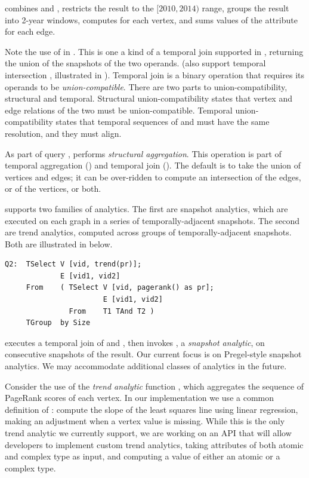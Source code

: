  combines \tgs {} and , restricts the
result to the $[2010, 2014)$ range, groups the result into 2-year
  windows, computes  for each vertex, and sums
  values of the attribute  for each edge.

Note the use of  in .  This is one a kind of a
temporal join supported in \ql, returning the union of the snapshots
of the two operands.  (\ql also support temporal intersection
, illustrated in ).  Temporal join is a binary
operation that requires its operands to be {\em union-compatible}.
There are two parts to \tg union-compatibility, structural and
temporal.  Structural union-compatibility states that vertex and edge
relations of the two \tgs must be union-compatible.  Temporal
union-compatibility states that temporal sequences of  and
 must have the same resolution, and they must align. 

As part of query , \ql performs {\em structural
  aggregation}.  This operation is part of temporal aggregation
() and temporal join ().  The default is to
take the union of vertices and edges; it can be over-ridden to compute
an intersection of the edges, or of the vertices, or both.

\ql supports two families of analytics.  The first are snapshot
analytics, which are executed on each graph in a series of
temporally-adjacent snapshots.  The second are trend analytics,
computed across groups of temporally-adjacent snapshots.  Both are
illustrated in  below.

\eat{{\footnotesize}}
\begin{small}
\begin{verbatim}
Q2:  TSelect V [vid, trend(pr)];
             E [vid1, vid2]  
     From    ( TSelect V [vid, pagerank() as pr];   
                       E [vid1, vid2]
               From    T1 TAnd T2 )
     TGroup  by Size
\end{verbatim}
\end{small}

 executes a temporal join of  and , then
invokes , a {\em snapshot analytic}, on consecutive
snapshots of the result.  Our current focus is on Pregel-style
snapshot analytics.  We may accommodate additional classes of
analytics in the future.

Consider the use of the {\em trend analytic} function
, which aggregates the sequence of PageRank scores of
each vertex.  In our implementation we use a common definition of
: compute the slope of the least squares line using
linear regression, making an adjustment when a vertex value is
missing.  While this is the only trend analytic we currently support,
we are working on an API that will allow developers to implement
custom trend analytics, taking attributes of both atomic and complex
type as input, and computing a value of either an atomic or a complex
type.


